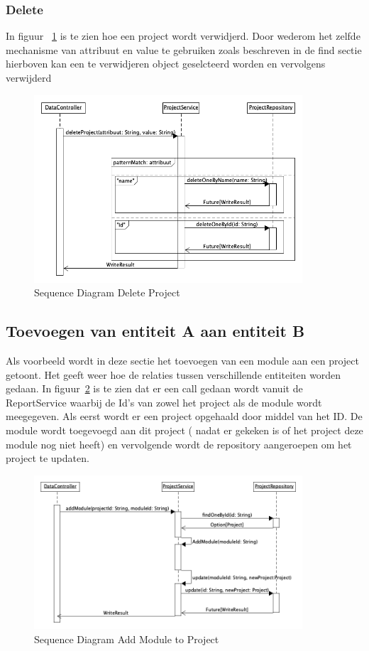 \subsubsection*{Delete}
In figuur ~\ref{fig:seqdiagDeleteProj} is te zien hoe een project wordt verwidjerd. Door wederom het zelfde mechanisme van attribuut en value te gebruiken zoals beschreven in de find sectie hierboven kan een te verwidjeren object geselcteerd worden en vervolgens verwijderd
\begin{figure}[h]
    \myfloatalign
    \includegraphics[width=10cm]{gfx/umlet/exports/CRUD-DeleteProject}
    \caption{Sequence Diagram Delete Project }
    \label{fig:seqdiagDeleteProj}
\end{figure}

\subsection{Toevoegen van entiteit A aan entiteit B}\label{subsec:toevoegen-van-entiteit-a-aan-entiteit-b}
Als voorbeeld wordt in deze sectie het toevoegen van een module aan een project getoont. Het geeft weer hoe de relaties tussen verschillende entiteiten worden gedaan. In figuur~\ref{fig:seqdiagModToProj} is te zien dat er een call
gedaan wordt vanuit de ReportService waarbij de Id's van zowel het project als de module wordt meegegeven. Als eerst wordt er een project opgehaald door middel van het ID. De module wordt toegevoegd aan dit project ( nadat er gekeken is of het project deze module nog niet heeft) en vervolgende wordt de repository aangeroepen om het project te updaten.
\begin{figure}[h]
    \myfloatalign
    \includegraphics[width=10cm]{gfx/umlet/exports/Relation-ModuleToProject}
    \caption{Sequence Diagram Add Module to Project }
    \label{fig:seqdiagModToProj}
\end{figure}

